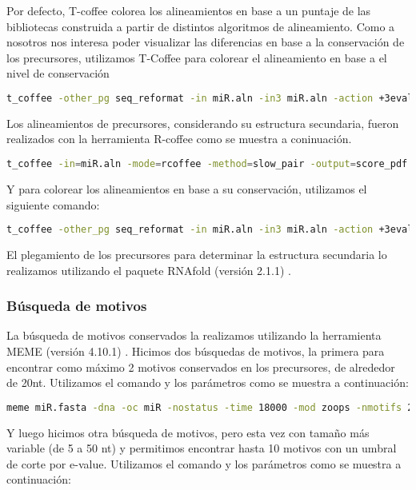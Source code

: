 Por defecto, T-coffee colorea los alineamientos en base a un puntaje de las bibliotecas construida a partir de distintos algoritmos de alineamiento.
Como a nosotros nos interesa poder visualizar las diferencias en base a la conservación de los precursores, utilizamos T-Coffee para colorear el alineamiento en base a el nivel de conservación

\begin{lstlisting}[language=bash]
t_coffee -other_pg seq_reformat -in miR.aln -in3 miR.aln -action +3evaluate idmat -out=miR_T_Coffee.pdf
\end{lstlisting}

Los alineamientos de precursores, considerando su estructura secundaria, fueron realizados con la herramienta R-coffee \citep{pmid18292307} como se muestra a coninuación.

\begin{lstlisting}[language=bash]
t_coffee -in=miR.aln -mode=rcoffee -method=slow_pair -output=score_pdf score_ascii -run_name=miR_R_Coffee
\end{lstlisting}

Y para colorear los alineamientos en base a su conservación, utilizamos el siguiente comando:

\begin{lstlisting}[language=bash]
t_coffee -other_pg seq_reformat -in miR.aln -in3 miR.aln -action +3evaluate idmat -out= miR.aln_R_Coffee.pdf
\end{lstlisting}

El plegamiento de los precursores para determinar la estructura secundaria lo realizamos utilizando el paquete RNAfold (versión 2.1.1) \citep{pmid22115189}.

\subsubsection{Búsqueda de motivos}
La búsqueda de motivos conservados la realizamos utilizando la herramienta MEME (versión 4.10.1) \citep{pmid7584402}.
Hicimos dos búsquedas de motivos, la primera para encontrar como máximo 2 motivos conservados en los precursores, de alrededor de 20nt.
Utilizamos el comando y los parámetros como se muestra a continuación:

\begin{lstlisting}[language=bash]
meme miR.fasta -dna -oc miR -nostatus -time 18000 -mod zoops -nmotifs 2 -minw 19 -maxw 23 -revcomp
\end{lstlisting}

Y luego hicimos otra búsqueda de motivos, pero esta vez con tamaño más variable (de 5 a 50 nt) y permitimos encontrar hasta 10 motivos con un umbral de corte por e-value.
Utilizamos el comando y los parámetros como se muestra a continuación:

